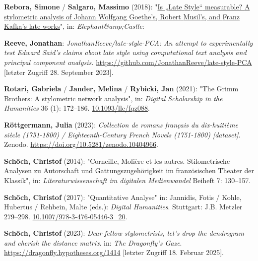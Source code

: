 \documentclass[
  12pt,
  letterpaper,
]{classicthesis}
\newlength{\cslhangindent}
\newenvironment{CSLReferences}[2] %
 {\begin{list}{}{%
  \setlength{\itemindent}{0pt}
  \setlength{\leftmargin}{0pt}
  \setlength{\parsep}{0pt}
  \ifodd #1
   \setlength{\leftmargin}{\cslhangindent}
   \setlength{\itemindent}{-1\cslhangindent}
  \fi
  \setlength{\itemsep}{#2\baselineskip}}}
 {\end{list}}
\begin{document}
\begin{CSLReferences}{1}{0}
\textbf{Rebora, Simone} / \textbf{Salgaro, Massimo} (2018):
"\href{https://www.academia.edu/37943274/Is_Late_Style_measurable_A_stylometric_analysis_of_Johann_Wolfgang_Goethe_s_Robert_Musil_s_and_Franz_Kafka_s_late_works}{Is
{„{Late} {Style}``} measurable? {A} stylometric analysis of {Johann}
{Wolfgang} {Goethe}'s, {Robert} {Musil}'s, and {Franz} {Kafka}'s late
works}", in: \emph{Elephant\&amp;Castle}:

\textbf{Reeve, Jonathan}: \emph{{JonathanReeve}/late-style-{PCA}: {An}
attempt to experimentally test {Edward} {Said}'s claims about late style
using computational text analysis and principal component analysis.}
\url{https://github.com/JonathanReeve/late-style-PCA} {[}letzter Zugriff
28. September 2023{]}.

\textbf{Rotari, Gabriela} / \textbf{Jander, Melina} / \textbf{Rybicki,
Jan} (2021): "The {Grimm} {Brothers}: {A} stylometric network analysis",
in: \emph{Digital Scholarship in the Humanities} 36 (1): 172--186.
\href{https://doi.org/10.1093/llc/fqz088}{10.1093/llc/fqz088}.

\textbf{Röttgermann, Julia} (2023): \emph{Collection de romans français
du dix-huitième siècle (1751-1800) / {Eighteenth}-{Century} {French}
{Novels} (1751-1800) {[}dataset{]}}. Zenodo.
\url{https://doi.org/10.5281/zenodo.10404966}.

\textbf{Schöch, Christof} (2014): "Corneille, {Molière} et les autres.
{Stilometrische} {Analysen} zu {Autorschaft} und {Gattungszugehörigkeit}
im französischen {Theater} der {Klassik}", in:
\emph{Literaturwissenschaft im digitalen Medienwandel} Beiheft 7:
130--157.

\textbf{Schöch, Christof} (2017): "Quantitative {Analyse}" in: Jannidis,
Fotis / Kohle, Hubertus / Rehbein, Malte (eds.): \emph{Digital
{Humanities}}. Stuttgart: J.B. Metzler 279--298.
\href{https://doi.org/10.1007/978-3-476-05446-3_20}{10.1007/978-3-476-05446-3\_20}.

\textbf{Schöch, Christof} (2023): \emph{Dear fellow stylometrists, let's
drop the dendrogram and cherish the distance matrix}. in: \emph{The
Dragonfly's Gaze}. \url{https://dragonfly.hypotheses.org/1414}
{[}letzter Zugriff 18. Februar 2025{]}.


\end{CSLReferences}
\end{document}
